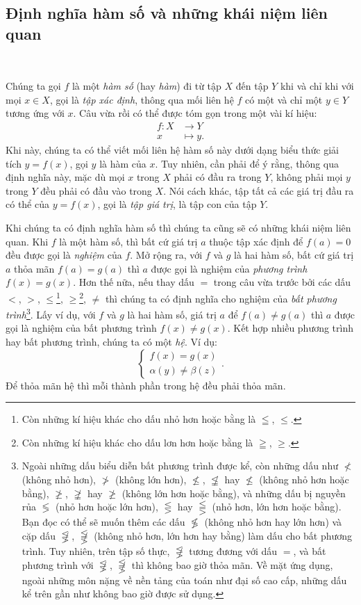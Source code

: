 \subsection{Định nghĩa hàm số và những khái niệm liên quan}

\ %

Chúng ta gọi $f$ là một \emph{hàm số} (hay \emph{hàm}) đi từ tập $X$ đến tập $Y$ khi và chỉ khi với mọi $x\in X$, gọi là \emph{tập xác định}, thông qua mối liên hệ $f$ có một và chỉ một $y\in Y$ tương ứng với $x$. Câu vừa rồi có thể được tóm gọn trong một vài kí hiệu: \begin{align*}f: X &\to Y \\ x &\mapsto y.\end{align*} Khi này, chúng ta có thể viết mối liên hệ hàm số này dưới dạng biểu thức giải tích $y=f(x)$, gọi $y$ là hàm của $x$. Tuy nhiên, cần phải để ý rằng, thông qua định nghĩa này, mặc dù mọi $x$ trong $X$ phải có đầu ra trong $Y$, không phải mọi $y$ trong $Y$ đều phải có đầu vào trong $X$. Nói cách khác, tập tất cả các giá trị đầu ra có thể của $y=f(x)$, gọi là \emph{tập giá trị}, là tập con của tập $Y$.

Khi chúng ta có định nghĩa hàm số thì chúng ta cũng sẽ có những khái niệm liên quan. Khi $f$ là một hàm số, thì bất cứ giá trị $a$ thuộc tập xác định để $f(a) = 0$ đều được gọi là \emph{nghiệm} của $f$. Mở rộng ra, với $f$ và $g$ là hai hàm số, bất cứ giá trị $a$ thỏa mãn $f(a) = g(a)$ thì $a$ được gọi là nghiệm của \emph{phương trình} $f(x) = g(x)$. Hơn thế nữa, nếu thay dấu $=$ trong câu vừa trước bởi các dấu $<$, $>$, $\leq$\footnote{Còn những kí hiệu khác cho dấu nhỏ hơn hoặc bằng là $\leqq$, $\leqslant$.}, $\geq$\footnote{Còn những kí hiệu khác cho dấu lơn hơn hoặc bằng là $\geqq$, $\geqslant$.}, $\neq$ thì chúng ta có định nghĩa cho nghiệm của \emph{bất phương trình}\footnote{Ngoài những dấu biểu diễn bất phương trình được kể, còn những dấu như $\nless$ (không nhỏ hơn), $\ngtr$ (không lớn hơn), $\nleq$, $\not \leqq$ hay $\nleqslant$ (không nhỏ hơn hoặc bằng), $\ngeq$, $\not \geqq$ hay $\ngeqslant$ (không lớn hơn hoặc bằng), và những dấu bị nguyền rủa $\lessgtr$ (nhỏ hơn hoặc lớn hơn), $\lesseqgtr$ hay $\lesseqqgtr$ (nhỏ hơn, lớn hơn hoặc bằng). Bạn đọc có thể sẽ muốn thêm các dấu $\not \lessgtr$ (không nhỏ hơn hay lớn hơn) và cặp dấu $\not \lesseqgtr$, $\not \lesseqqgtr$ (không nhỏ hơn, lớn hơn hay bằng) làm dấu cho bất phương trình. Tuy nhiên, trên tập số thực, $\not \lesseqgtr$ tương đương với dấu $=$, và bất phương trình với $\not \lesseqgtr$, $\not \lesseqqgtr$ thì không bao giờ thỏa mãn. Về mặt ứng dụng, ngoài những môn nặng về nền tảng của toán như đại số cao cấp, những dấu kể trên gần như không bao giờ được sử dụng.}. Lấy ví dụ, với $f$ và $g$ là hai hàm số, giá trị $a$ để $f(a) \neq g(a)$ thì $a$ được gọi là nghiệm của bất phương trình $f(x) \neq g(x)$. Kết hợp nhiều phương trình hay bất phương trình, chúng ta có một \emph{hệ}. Ví dụ:
$$
\begin{cases}
   f(x) = g(x) \\
   \alpha(y) \neq \beta(z)
\end{cases}.
$$
Để thỏa mãn hệ thì mỗi thành phần trong hệ đều phải thỏa mãn.

